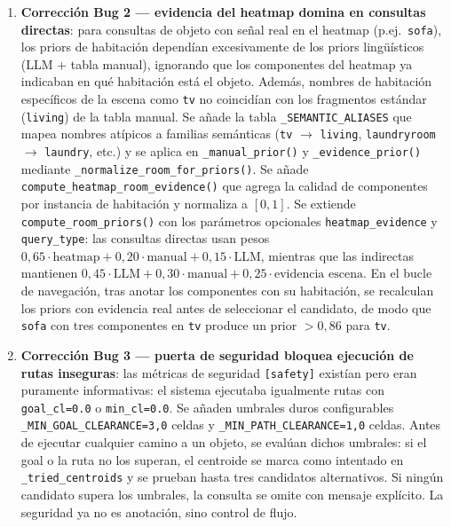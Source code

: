 \begin{enumerate}
  \item \textbf{Corrección Bug 2 — evidencia del heatmap domina en consultas
        directas}: para consultas de objeto con señal real en el heatmap (p.ej.\
        \texttt{sofa}), los priors de habitación dependían excesivamente de los
        priors lingüísticos (LLM + tabla manual), ignorando que los componentes del
        heatmap ya indicaban en qué habitación está el objeto. Además, nombres de
        habitación específicos de la escena como \texttt{tv} no coincidían con los
        fragmentos estándar (\texttt{living}) de la tabla manual. Se añade la tabla
        \texttt{\_SEMANTIC\_ALIASES} que mapea nombres atípicos a familias semánticas
        (\texttt{tv} $\to$ \texttt{living}, \texttt{laundryroom} $\to$
        \texttt{laundry}, etc.) y se aplica en \texttt{\_manual\_prior()} y
        \texttt{\_evidence\_prior()} mediante \texttt{\_normalize\_room\_for\_priors()}.
        Se añade \texttt{compute\_heatmap\_room\_evidence()} que agrega la calidad de
        componentes por instancia de habitación y normaliza a $[0,1]$. Se extiende
        \texttt{compute\_room\_priors()} con los parámetros opcionales
        \texttt{heatmap\_evidence} y \texttt{query\_type}: las consultas directas usan
        pesos $0{,}65 \cdot \text{heatmap} + 0{,}20 \cdot \text{manual} + 0{,}15
        \cdot \text{LLM}$, mientras que las indirectas mantienen
        $0{,}45 \cdot \text{LLM} + 0{,}30 \cdot \text{manual} + 0{,}25 \cdot
        \text{evidencia escena}$. En el bucle de navegación, tras anotar los
        componentes con su habitación, se recalculan los priors con evidencia real
        antes de seleccionar el candidato, de modo que \texttt{sofa} con tres
        componentes en \texttt{tv} produce un prior $>0{,}86$ para \texttt{tv}.

  \item \textbf{Corrección Bug 3 — puerta de seguridad bloquea ejecución de rutas
        inseguras}: las métricas de seguridad \texttt{[safety]} existían pero eran
        puramente informativas: el sistema ejecutaba igualmente rutas con
        \texttt{goal\_cl=0.0} o \texttt{min\_cl=0.0}. Se añaden umbrales duros
        configurables \texttt{\_MIN\_GOAL\_CLEARANCE=3{,}0} celdas y
        \texttt{\_MIN\_PATH\_CLEARANCE=1{,}0} celdas. Antes de ejecutar cualquier
        camino a un objeto, se evalúan dichos umbrales: si el goal o la ruta no los
        superan, el centroide se marca como intentado en \texttt{\_tried\_centroids}
        y se prueban hasta tres candidatos alternativos. Si ningún candidato
        supera los umbrales, la consulta se omite con mensaje explícito. La
        seguridad ya no es anotación, sino control de flujo.


\end{enumerate}
